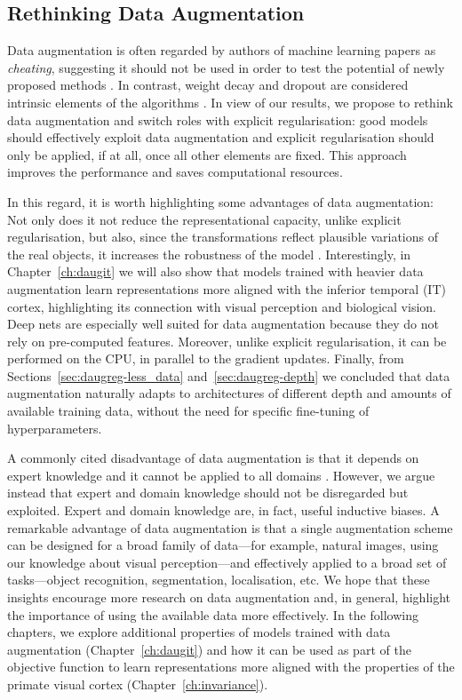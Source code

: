 {\subsection{Rethinking Data Augmentation}
\label{sec:daugreg-rethink_daug}
Data augmentation is often regarded by authors of machine learning papers as \textit{cheating}, suggesting it should not be used in order to test the potential of newly proposed methods \citep{goodfellow2013maxout, graham2014fracmaxpool, larsson2016fractalnet}. In contrast, weight decay and dropout are considered intrinsic elements of the algorithms \citep{tan2019efficientnet}. In view of our results, we propose to rethink data augmentation and switch roles with explicit regularisation: good models should effectively exploit data augmentation and explicit regularisation should only be applied, if at all, once all other elements are fixed. This approach improves the performance and saves computational resources.

In this regard, it is worth highlighting some advantages of data augmentation: Not only does it not reduce the representational capacity, unlike explicit regularisation, but also, since the transformations reflect plausible variations of the real objects, it increases the robustness of the model \cite{novak2018sensitivity, rusak2020robustness}. Interestingly, in Chapter~\ref{ch:daugit} we will also show that models trained with heavier data augmentation learn representations more aligned with the inferior temporal (IT) cortex, highlighting its connection with visual perception and biological vision. Deep nets are especially well suited for data augmentation because they do not rely on pre-computed features. Moreover, unlike explicit regularisation, it can be performed on the CPU, in parallel to the gradient updates. Finally, from Sections~\ref{sec:daugreg-less_data} and~\ref{sec:daugreg-depth} we concluded that data augmentation naturally adapts to architectures of different depth and amounts of available training data, without the need for specific fine-tuning of hyperparameters.

A commonly cited disadvantage of data augmentation is that it depends on expert knowledge and it cannot be applied to all domains \citep{devries2017daugfeatspace}. However, we argue instead that expert and domain knowledge should not be disregarded but exploited. Expert and domain knowledge are, in fact, useful inductive biases. A remarkable advantage of data augmentation is that a single augmentation scheme can be designed for a broad family of data---for example, natural images, using our knowledge about visual perception---and effectively applied to a broad set of tasks---object recognition, segmentation, localisation, etc. We hope that these insights encourage more research on data augmentation and, in general, highlight the importance of using the available data more effectively. In the following chapters, we explore additional properties of models trained with data augmentation (Chapter~\ref{ch:daugit}) and how it can be used as part of the objective function to learn representations more aligned with the properties of the primate visual cortex (Chapter~\ref{ch:invariance}).

\chapterbibliography
}
